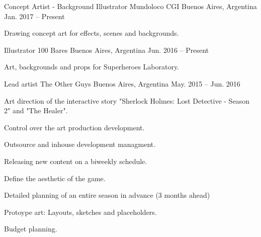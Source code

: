 

\begin{cventries}

  \cventry
        {Concept Artist - Background Illustrator} %
        {Mundoloco CGI} %
        {Buenos Aires, Argentina} %
        {Jan. 2017 – Present} %
        {
          \begin{cvitems} %
            \item {Drawing concept art for effects, scenes and backgrounds.}
          \end{cvitems}
        }

  \cventry
        {Illustrator} %
        {100 Bares} %
        {Buenos Aires, Argentina} %
        {Jun. 2016 – Present} %
        {
          \begin{cvitems} %
            \item {Art, backgrounds and props for Superheroes Laboratory.}
          \end{cvitems}
        }

  \cventry
      {Lead artist} %
      {The Other Guys} %
      {Buenos Aires, Argentina} %
      {May. 2015 – Jun. 2016} %
      {
        \begin{cvitems} %
          \item {Art direction of the interactive story "Sherlock Holmes: Lost Detective - Season 2" and "The Healer".}
          \item {Control over the art production development.}
          \item {Outsource and inhouse development managment.}
          \item {Releasing new content on a biweekly schedule.}
          \item {Define the aesthetic of the game.}
          \item {Detailed planning of an entire season in advance (3 months ahead)}
          \item {Protoype art: Layouts, sketches and placeholders.}
          \item {Budget planning.}
        \end{cvitems}
      }



\end{cventries}
